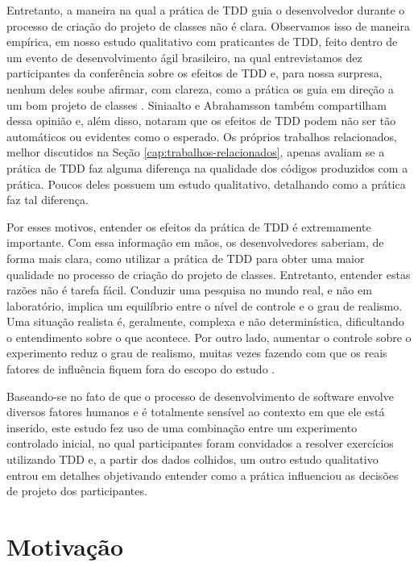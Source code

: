 Entretanto, a maneira na qual a prática de TDD guia o desenvolvedor
durante o processo de criação do projeto de classes não é clara. Observamos
isso de maneira empírica, em nosso estudo qualitativo com praticantes de TDD, feito dentro de um
evento de desenvolvimento ágil brasileiro, na qual entrevistamos dez
participantes da conferência sobre os efeitos de TDD e, para nossa surpresa,
nenhum deles soube afirmar, com clareza, como a prática os guia em direção
a um bom projeto de classes \cite{aniche-wbma}.
Siniaalto e Abrahamsson \cite{alarming-results} também
compartilham dessa opinião e, além disso, notaram que os efeitos de TDD podem 
não ser tão automáticos ou evidentes como o esperado.
Os próprios trabalhos relacionados, melhor discutidos na Seção \ref{cap:trabalhos-relacionados},
apenas avaliam se a prática de TDD faz alguma diferença na qualidade dos códigos produzidos
com a prática. Poucos deles possuem um estudo qualitativo, detalhando como a prática
faz tal diferença.

Por esses motivos, entender os efeitos da prática de TDD é extremamente importante.
Com essa informação em mãos, os desenvolvedores saberiam, de forma mais clara,
como utilizar a prática de TDD para obter uma maior qualidade no processo de criação
do projeto de classes. Entretanto, entender estas razões não é tarefa fácil. 
Conduzir uma pesquisa no mundo real, e não em laboratório, 
implica um equilíbrio entre o nível de controle
e o grau de realismo. Uma situação realista é, geralmente, complexa e 
não determinística, dificultando o entendimento sobre o que acontece. Por outro
lado, aumentar o controle sobre o experimento reduz o grau de realismo, muitas
vezes fazendo com que os reais fatores de influência fiquem fora do escopo do 
estudo \cite{guidelines-case-study}.

Baseando-se no fato de que o processo de desenvolvimento de software envolve 
diversos fatores humanos e é totalmente sensível ao contexto em que ele está 
inserido, 
este estudo fez uso de uma combinação entre um experimento controlado inicial, 
no qual participantes foram convidados a resolver exercícios utilizando TDD e, 
a partir dos dados colhidos, um outro estudo qualitativo entrou em 
detalhes objetivando entender como a prática influenciou as decisões de projeto 
dos participantes.

\section{Motivação}

